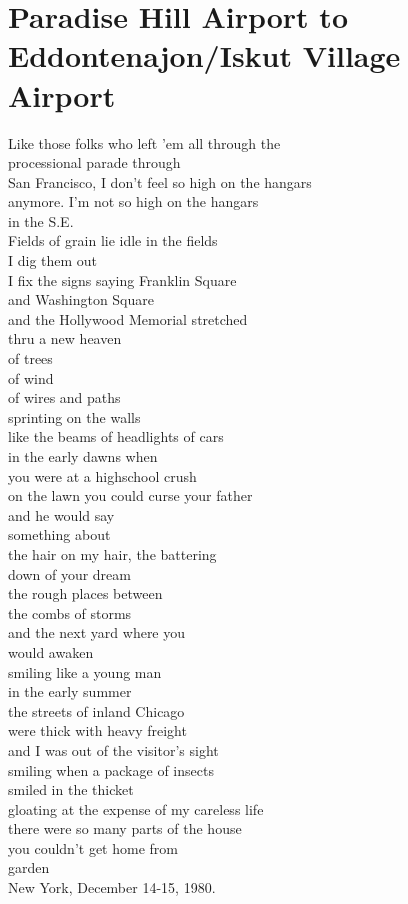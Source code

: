 \documentclass[smalldemyvopaper,11pt,twoside,onecolumn,openright,extrafontsizes]{memoir}
\begin{document}
\chapter{Paradise Hill Airport to Eddontenajon/Iskut Village Airport}
Like those folks who left 'em all through the
\\processional parade through
\\San Francisco, I don't feel so high on the hangars
\\anymore. I'm not so high on the hangars
\\in the S.E.
\\Fields of grain lie idle in the fields
\\I dig them out
\\I fix the signs saying Franklin Square
\\and Washington Square
\\and the Hollywood Memorial stretched
\\thru a new heaven
\\of trees
\\of wind
\\of wires and paths
\\sprinting on the walls
\\like the beams of headlights of cars
\\in the early dawns when
\\you were at a highschool crush
\\on the lawn you could curse your father
\\and he would say
\\something about
\\the hair on my hair, the battering
\\down of your dream
\\the rough places between
\\the combs of storms
\\and the next yard where you
\\would awaken
\\smiling like a young man
\\in the early summer
\\the streets of inland Chicago
\\were thick with heavy freight
\\and I was out of the visitor's sight
\\smiling when a package of insects
\\smiled in the thicket
\\gloating at the expense of my careless life
\\there were so many parts of the house
\\you couldn't get home from
\\garden
\\New York, December 14-15, 1980.
\end{document}
